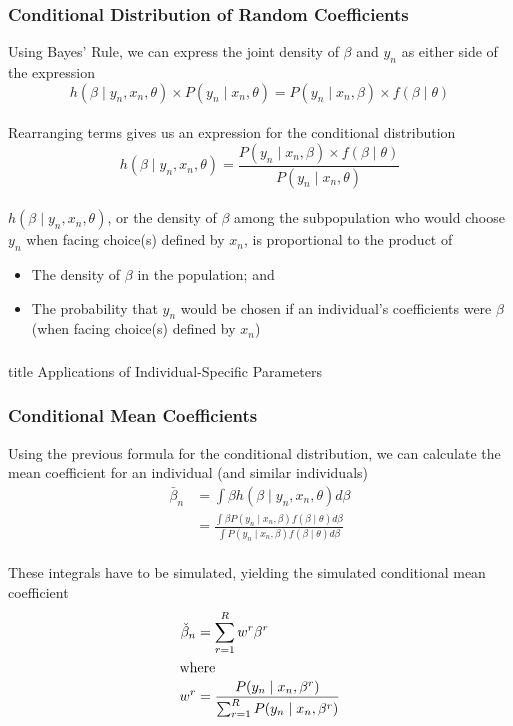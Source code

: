 \documentclass{beamer}
\begin{document}
\begin{frame}\frametitle{Conditional Distribution of Random Coefficients}
    Using Bayes' Rule, we can express the joint density of $\beta$ and $y_n$ as either side of the expression
    $$h(\beta \mid y_n, x_n, \theta) \times P(y_n \mid x_n, \theta) = P(y_n \mid x_n, \beta) \times f(\beta \mid \theta)$$ \\
    \vspace{1ex}
    Rearranging terms gives us an expression for the conditional distribution
    $$h(\beta \mid y_n, x_n, \theta) = \frac{P(y_n \mid x_n, \beta) \times f(\beta \mid \theta)}{P(y_n \mid x_n, \theta)}$$ \\
    \vspace{1ex}
    $h(\beta \mid y_n, x_n, \theta)$, or the density of $\beta$ among the subpopulation who would choose $y_n$ when facing choice(s) defined by $x_n$, is proportional to the product of
    \begin{itemize}
    	\item The density of $\beta$ in the population; and
    	\item The probability that $y_n$ would be chosen if an individual's coefficients were $\beta$ (when facing choice(s) defined by $x_n$)
    \end{itemize}
\end{frame}

\begin{frame}\frametitle{}
    \vfill
    \centering
    \begin{beamercolorbox}[center]{title}
        \Large Applications of Individual-Specific Parameters
    \end{beamercolorbox}
    \vfill
\end{frame}

\begin{frame}\frametitle{Conditional Mean Coefficients}
    Using the previous formula for the conditional distribution, we can calculate the mean coefficient for an individual (and similar individuals)
    \begin{align*}
    	\bar{\beta}_n &= \int \beta h(\beta \mid y_n, x_n, \theta) d \beta \\
    	&= \frac{\int \beta P(y_n \mid x_n, \beta) f(\beta \mid \theta) d \beta}{\int P(y_n \mid x_n, \beta) f(\beta \mid \theta) d \beta}
    \end{align*} \\
    \vspace{2ex}
    These integrals have to be simulated, yielding the simulated conditional mean coefficient
    \begin{align*}
    	\check{\beta}_n &= \sum_{r = 1}^R w^r \beta^r \\
    	\intertext{where}
    	w^r &= \frac{P(y_n \mid x_n, \beta^r)}{\sum_{r = 1}^R P(y_n \mid x_n, \beta^r)}
    \end{align*}
\end{frame}
\end{document}
